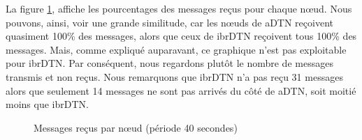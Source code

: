 \documentclass[a4paper,10pt]{article}
\begin{document}
La figure \ref{fig:40_msg_rcv}, affiche les pourcentages des messages reçus pour chaque nœud. Nous pouvons, ainsi, voir une grande similitude, car les nœuds de aDTN reçoivent quasiment 100\% des messages, alors que ceux de ibrDTN reçoivent tous 100\% des messages. Mais, comme expliqué auparavant, ce graphique n’est pas exploitable pour ibrDTN. Par conséquent, nous regardons plutôt le nombre de messages transmis et non reçus. Nous remarquons que ibrDTN n’a pas reçu 31 messages alors que seulement 14 messages ne sont pas arrivés du côté de aDTN, soit moitié moins que ibrDTN.

\begin{figure}[h!]
    \centering
    \caption{Messages reçus par nœud (période 40 secondes)}
    \label{fig:40_msg_rcv}
\end{figure}

\newpage
\end{document}
